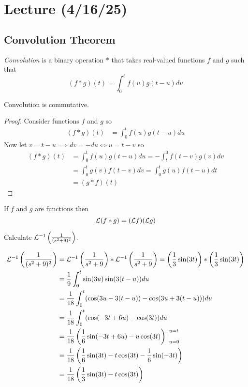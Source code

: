 \documentclass[notes]{subfiles}
\begin{document}
\setcounter{section}{21}
\section{Lecture (4/16/25)}

\subsection{Convolution Theorem}
\begin{definition}
    \textsl{Convolution} is a binary operation $\ast$ that takes real-valued functions $f$ and $g$ such that
    \[
        (f\ast g)(t) = \int_0^t f(u)g(t - u)du
    \]
\end{definition}

\begin{lemma}
    Convolution is commutative.
\end{lemma}
\begin{proof}
    Consider functions $f$ and $g$ so
    \begin{align*}
        (f\ast g)(t)
        &= \int_0^t f(u)g(t - u)du
    \end{align*}
    Now let $v = t - u \implies dv = -du \iff u = t - v$ so
    \begin{align*}
        (f\ast g)(t)
        &= \int_0^t f(u)g(t - u)du
        = -\int_t^0 f(t - v)g(v)dv \\
        &= \int_0^t g(v)f(t - v)dv
        = \int_0^t g(u)f(t - u)dt \\
        &= (g \ast f)(t)
    \end{align*}
\end{proof}

\begin{theorem}
    If $f$ and $g$ are functions then
    \[
        \mathcal{L}(f \ast g) = (\mathcal{L} f)(\mathcal{L} g)
    \]
\end{theorem}

\begin{exercise}
    Calculate $\mathcal{L}^{-1}\left( \frac{1}{(s^2 + 9)^2} \right)$.
\end{exercise}
\begin{solution}
    \begin{align*}
        \mathcal{L}^{-1}\left( \frac{1}{(s^2 + 9)^2} \right)
        &= \mathcal{L}^{-1}\left( \frac{1}{s^2 + 9} \right) \ast \mathcal{L}^{-1}\left( \frac{1}{s^2 + 9} \right)
        = \left(\frac{1}{3}\sin(3t)\right)\ast\left(\frac{1}{3}\sin(3t)\right) \\
        &= \frac{1}{9} \int_0^t \sin(3u)\sin(3(t - u))du \\
        &= \frac{1}{18} \int_0^t ( \cos(3u - 3(t - u)) - \cos(3u + 3(t - u)) )du \\
        &= \frac{1}{18} \int_0^t ( \cos(-3t + 6u) - \cos(3t) )du \\
        &= \frac{1}{18} \left( \frac{1}{6}\sin(-3t + 6u) - u\cos(3t) \right)\Big|_{u = 0}^{u = t} \\
        &= \frac{1}{18} \left( \frac{1}{6}\sin(3t) - t\cos(3t) - \frac{1}{6}\sin(-3t) \right) \\
        &= \frac{1}{18} \left( \frac{1}{3}\sin(3t) - t\cos(3t) \right)
    \end{align*}
\end{solution}
\end{document}
